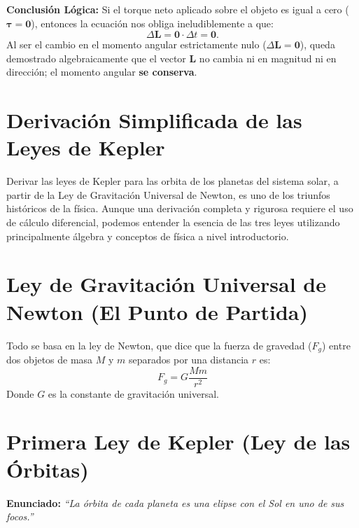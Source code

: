 \documentclass[11pt,a4paper]{book}
\begin{document}
\textbf{Conclusión Lógica:}
Si el torque neto aplicado sobre el objeto es igual a cero ($\boldsymbol{\tau} = \boldsymbol{0}$), entonces la ecuación nos obliga ineludiblemente a que:
\begin{equation}
    \Delta \boldsymbol{L} = \boldsymbol{0} \cdot \Delta t = \boldsymbol{0}.
\end{equation}
Al ser el cambio en el momento angular estrictamente nulo ($\Delta \boldsymbol{L} = \boldsymbol{0}$), queda demostrado algebraicamente que el vector $\boldsymbol{L}$ no cambia ni en magnitud ni en dirección; el momento angular \textbf{se conserva}.

\section{Derivación Simplificada de las Leyes de Kepler}

Derivar las leyes de Kepler para las orbita de los planetas del sistema solar, a partir de la Ley de Gravitación Universal de Newton, es uno de los triunfos históricos de la física. Aunque una derivación completa y rigurosa requiere el uso de cálculo diferencial, podemos entender la esencia de las tres leyes utilizando principalmente álgebra y conceptos de física a nivel introductorio.

\section*{Ley de Gravitación Universal de Newton (El Punto de Partida)}

Todo se basa en la ley de Newton, que dice que la fuerza de gravedad ($F_g$) entre dos objetos de masa $M$ y $m$ separados por una distancia $r$ es:
\[
    F_g = G \frac{Mm}{r^2}
\]
Donde $G$ es la constante de gravitación universal.


\section*{Primera Ley de Kepler (Ley de las Órbitas)}
\textbf{Enunciado:} \textit{“La órbita de cada planeta es una elipse con el Sol en uno de sus focos.”}

\end{document}

